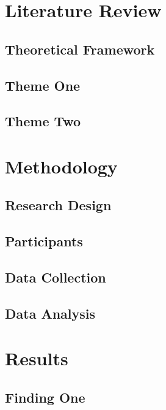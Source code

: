 \documentclass[12pt, a4paper]{article}
\begin{document}
\section{Literature Review}

\subsection{Theoretical Framework}

\subsection{Theme One}

\subsection{Theme Two}

\section{Methodology}

\subsection{Research Design}

\subsection{Participants}

\subsection{Data Collection}

\subsection{Data Analysis}

\section{Results}

\subsection{Finding One}
\end{document}
